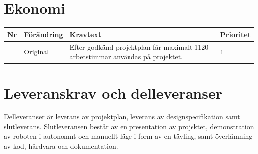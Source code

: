 \documentclass[a4paper,titlepage,12pt]{article}
\newcounter{reqNr}
\newcommand{\nextReqNr}{\stepcounter{reqNr}\arabic{reqNr}}
\begin{document}
	\section{Ekonomi}

	\begin{longtable}[c]{ c l>{\raggedright}p{} l }
		\textbf{Nr} & \textbf{Förändring} & \textbf{Kravtext} & \textbf{Prioritet} 
		\\ \midrule
		
		\nextReqNr{} & Original & Efter godkänd projektplan får
			maximalt 1120 arbetstimmar användas på projektet. & 1
	\end{longtable}

	\section{Leveranskrav och delleveranser}
	Delleveranser är leverans av projektplan, leverans av designspecifikation 
	samt slutleverans. Slutleveransen består av en presentation av projektet, 
	demonstration av roboten i autonomnt och manuellt läge i form av en tävling,
	samt överlämning av kod, hårdvara och dokumentation.

	\newpage
\end{document}
